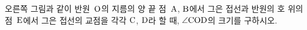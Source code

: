 \noindent\begin{minipage}[t]{0.58\linewidth}\vspace{0pt}\raggedright 오른쪽 그림과 같이 반원~$\mathrm{O}$의 지름의 양 끝 점~$\mathrm{A}$, $\mathrm{B}$에서 그은 접선과 반원의 호 위의 점~$\mathrm{E}$에서 그은 접선의 교점을 각각 $\mathrm{C}$, $\mathrm{D}$라 할 때, $\angle\mathrm{COD}$의 크기를 구하시오.\end{minipage}\hfill\begin{minipage}[t]{0.4\linewidth}\vspace{0pt}\centering \resizebox{\ifdim\width>\linewidth\linewidth\else\width\fi}{!}{}\end{minipage}\par
